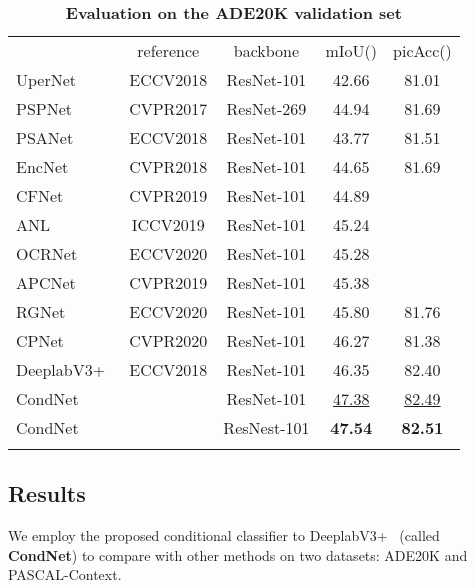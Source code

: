 \documentclass[journal]{IEEEtran}
\begin{document}
\begin{table}[t]
\centering
\setlength{\tabcolsep}{2.0pt}
\small
\renewcommand{\arraystretch}{1.4}
\caption{\textbf{Evaluation on
	the ADE20K validation set}}
\label{tab:ade20k}
\begin{tabular}{l|c|c|c|c}
\shline
\multicolumn{1}{c|}{model} & reference & backbone & mIoU() & picAcc()\\ 
\shline
UperNet~\cite{Xiao-UperNet-ECCV-2018}   & ECCV2018 & ResNet-101 & 42.66 & 81.01 \\
PSPNet~\cite{Zhao-CVPR-PSPNet-2017}    & CVPR2017 & ResNet-269 & 44.94 & 81.69 \\
PSANet~\cite{Zhao-ECCV-PSANet-2018}    & ECCV2018 & ResNet-101 & 43.77 & 81.51 \\
EncNet~\cite{Zhang-CVPR-EncNet-2018}    & CVPR2018 & ResNet-101 & 44.65 & 81.69 \\
CFNet~\cite{Zhang-CVPR-CFNet-2019}     & CVPR2019 & ResNet-101 & 44.89 &  \\
ANL~\cite{Zhu-ICCV-ANL-2019}       & ICCV2019 & ResNet-101 & 45.24 &  \\
OCRNet~\cite{Yuan-ECCV-OCRNet-2019}    & ECCV2020 & ResNet-101 & 45.28 &  \\
APCNet~\cite{He-CVPR-APCNet-2019}    & CVPR2019 & ResNet-101 & 45.38 &  \\
RGNet~\cite{Yu-ECCV-RepGraph-2020}     & ECCV2020 & ResNet-101 & 45.80 & 81.76 \\
CPNet~\cite{Yu-CVPR-CPNet-2020}    & CVPR2020 & ResNet-101 & 46.27 & 81.38 \\
DeeplabV3+~\cite{Chen-ECCV-Deeplabv3p-2018} & ECCV2018 & ResNet-101 & 46.35 & 82.40 \\
\hline
CondNet	  & & ResNet-101  & \underline{47.38} & \underline{82.49} \\
CondNet	  & & ResNest-101 & \textbf{47.54} & \textbf{82.51} \\
\shline	
\end{tabular}
\end{table}	


\subsection{Results}
We employ the proposed conditional classifier to 
DeeplabV3+~\cite{Chen-ECCV-Deeplabv3p-2018} (called \textbf{CondNet}) to 
compare with other methods 
on two datasets: ADE20K and PASCAL-Context.
\end{document}
